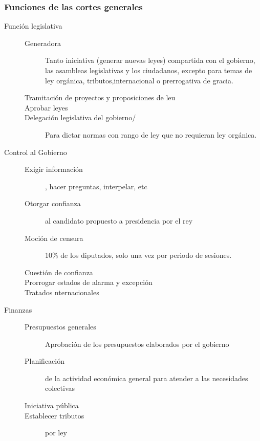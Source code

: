     \subsubsection{Funciones de las cortes generales}
    \begin{description}
        \item[Función legislativa] \hfill %
        \begin{description}
            \item[Generadora] Tanto iniciativa (generar nuevas leyes) compartida con el gobierno, las asambleas legislativas y los ciudadanos, excepto para temas de ley orgánica, tributos,internacional o prerrogativa de gracia.
            \item[Tramitación de proyectos y proposiciones de leu] 
            \item[Aprobar leyes]
            \item[Delegación legislativa del gobierno/] Para dictar normas con rango de ley que no requieran ley orgánica.
        \end{description}
        \item[Control al Gobierno] \hfill
        \begin{description}
            \item[Exigir información], hacer preguntas, interpelar, etc
            \item[Otorgar confianza] al candidato propuesto a presidencia por el rey
            \item[Moción de censura] 10\% de los diputados, solo una vez por periodo de sesiones.
            \item[Cuestión de confianza]
            \item[Prorrogar estados de alarma y excepción]
            \item[Tratados nternacionales] 
        \end{description}
        \item[Finanzas]
        \begin{description}
            \item[Presupuestos generales] Aprobación de los presupuestos elaborados por el gobierno
            \item[Planificación] de la actividad económica general para atender a las necesidades colectivas
            \item[Iniciativa pública] 
            \item[Establecer tributos] por ley

\end{description}
\end{description}
